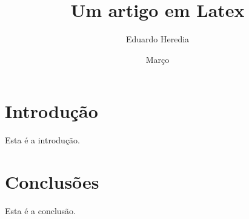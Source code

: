 \documentclass[a4paper,12pt]{article}
\title{Um artigo em Latex}
\author{Eduardo Heredia}
\date{Março}
\begin{document}
  \maketitle

  \section{Introdução}
 
  Esta é a introdução.

  \section{Conclusões}

  Esta é a conclusão.
\end{document}
